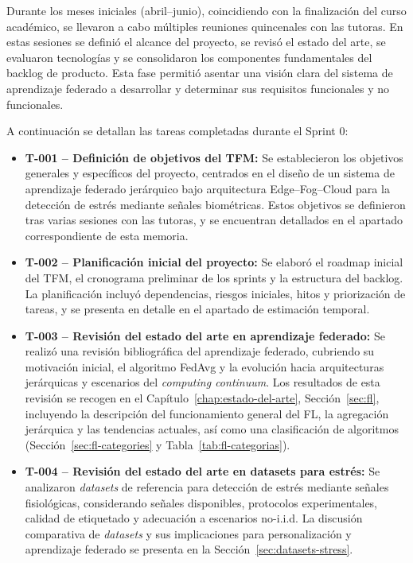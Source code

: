 \documentclass{report}
\begin{document}
Durante los meses iniciales (abril–junio), coincidiendo con la finalización del curso académico, se llevaron a cabo múltiples reuniones quincenales con las tutoras. En estas sesiones se definió el alcance del proyecto, se revisó el estado del arte, se evaluaron tecnologías y se consolidaron los componentes fundamentales del backlog de producto. Esta fase permitió asentar una visión clara del sistema de aprendizaje federado a desarrollar y determinar sus requisitos funcionales y no funcionales.

A continuación se detallan las tareas completadas durante el Sprint 0:
\begin{itemize}
  \item \textbf{T-001 – Definición de objetivos del TFM:}  
  Se establecieron los objetivos generales y específicos del proyecto, centrados en el diseño de un sistema de aprendizaje federado jerárquico bajo arquitectura Edge–Fog–Cloud para la detección de estrés mediante señales biométricas.  
  Estos objetivos se definieron tras varias sesiones con las tutoras, y se encuentran detallados en el apartado correspondiente de esta memoria.

  \item \textbf{T-002 – Planificación inicial del proyecto:}  
  Se elaboró el roadmap inicial del TFM, el cronograma preliminar de los sprints y la estructura del backlog.  
  La planificación incluyó dependencias, riesgos iniciales, hitos y priorización de tareas, y se presenta en detalle en el apartado de estimación temporal.

  \item \textbf{T-003 – Revisión del estado del arte en aprendizaje federado:}  
  Se realizó una revisión bibliográfica del aprendizaje federado, cubriendo su motivación inicial, el algoritmo FedAvg y la evolución hacia arquitecturas jerárquicas y escenarios del \textit{computing continuum}.  
Los resultados de esta revisión se recogen en el Capítulo~\ref{chap:estado-del-arte}, Sección~\ref{sec:fl}, incluyendo la descripción del funcionamiento general del FL, la agregación jerárquica y las tendencias actuales, así como una clasificación de algoritmos (Sección~\ref{sec:fl-categories} y Tabla~\ref{tab:fl-categorias}).  


  \item \textbf{T-004 – Revisión del estado del arte en datasets para estrés:}  
  Se analizaron \textit{datasets} de referencia para detección de estrés mediante señales fisiológicas, considerando señales disponibles, protocolos experimentales, calidad de etiquetado y adecuación a escenarios no-i.i.d. La discusión comparativa de \textit{datasets} y sus implicaciones para personalización y aprendizaje federado se presenta en la Sección~\ref{sec:datasets-stress}.


\end{itemize}
\end{document}
